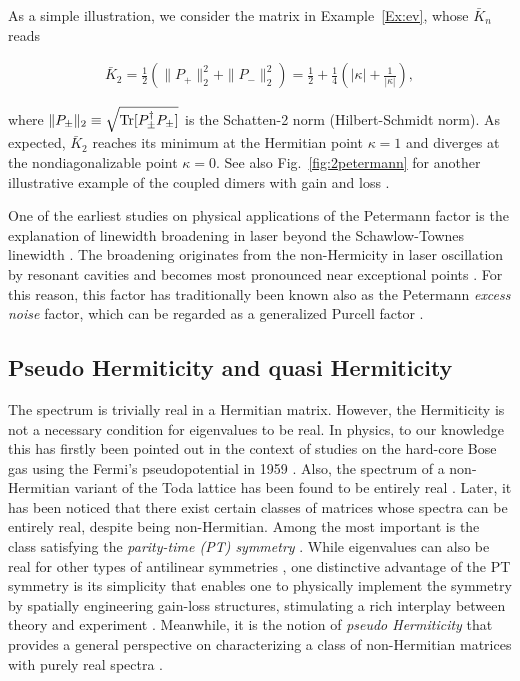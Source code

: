 \documentclass{tADP2e}
\theoremstyle{plain}
\newcommand{\eqn}[1]{
\begin{eqnarray}
	#1
\end{eqnarray}
}
\theoremstyle{plain}
\theoremstyle{definition}
\begin{document}
As a simple illustration, we consider the matrix in Example~\ref{Ex:ev}, whose $\bar K_n$ reads
\eqn{
\bar{K}_2=\frac{1}{2}(\|P_+\|^2_2+\|P_-\|^2_2)=\frac{1}{2}+\frac{1}{4}\left(|\kappa|+\frac{1}{|\kappa|}\right),
}
where $\|P_\pm\|_2\equiv\sqrt{{\rm Tr}[P_\pm^\dag P_\pm]}$ is the Schatten-2 norm (Hilbert-Schmidt norm). As expected, $\bar K_2$ reaches its minimum  at the Hermitian point $\kappa=1$ and diverges at the nondiagonalizable point $\kappa=0$. See also Fig.~\ref{fig:2petermann} for another illustrative example of the coupled dimers with gain and loss \cite{ZMC10}. 


One of the earliest studies on physical applications of the Petermann factor is the explanation of linewidth broadening \cite{HWA90} in laser beyond the Schawlow-Townes linewidth \cite{SAL58}. The broadening originates from the non-Hermicity in laser oscillation by resonant cavities and becomes most pronounced near exceptional points \cite{MVB03}. For this reason, this factor has traditionally been known also as the Petermann {\it excess noise} factor, which can be regarded as a generalized Purcell factor \cite{LZ16}.   

\subsection{Pseudo Hermiticity and quasi Hermiticity\label{secphqh}}
The spectrum is trivially real in a Hermitian matrix.  However, the Hermiticity is not a necessary condition for eigenvalues to be real. In physics, to our knowledge this has firstly been pointed out in the context of studies on the hard-core Bose gas using the Fermi's pseudopotential in 1959 \cite{WTT59}. Also, the spectrum of a non-Hermitian variant of the Toda lattice has been found to be entirely real \cite{TH92}.  Later, it has been noticed that there exist certain classes of matrices whose spectra can be entirely real, despite being non-Hermitian. Among the most important is the class satisfying the \emph{parity-time (PT) symmetry} \cite{BCM98}. While eigenvalues can also be real for other types of antilinear symmetries \cite{CMB02}, one distinctive advantage of the PT symmetry is its simplicity that enables one to physically implement the symmetry by spatially engineering gain-loss structures, stimulating a rich interplay between theory and experiment \cite{EG18}. Meanwhile, it is the notion of \emph{pseudo Hermiticity} that provides a general perspective on characterizing a class of non-Hermitian matrices with purely real spectra \cite{AM10}. 
\end{document}
